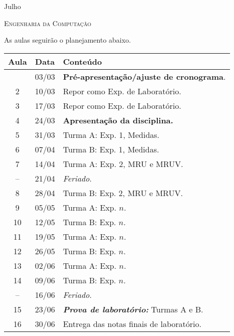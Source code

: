 %
\begin{marginfigure}
    \centering
    Julho\\
\end{marginfigure}
\vspace{1cm}
\begin{center}
\Large\textsc{Engenharia da Computação}
\end{center}

As aulas seguirão o planejamento abaixo.
\begin{center}
\begin{longtable}{ccp{70mm}}
\toprule
Aula & Data & Conteúdo \\
\midrule
\endhead
\bottomrule
\endfoot
 1 & 03/03 & \textbf{Pré-apresentação/ajuste de cronograma}. \\
 2 & 10/03 & Repor como Exp. de Laboratório. \\
 3 & 17/03 & Repor como Exp. de Laboratório. \\
 4 & 24/03 & \textbf{Apresentação da disciplina.} \\ 
 5 & 31/03 & Turma A: Exp. 1, Medidas. \\
 6 & 07/04 & Turma B: Exp. 1, Medidas. \\
 7 & 14/04 & Turma A: Exp. 2, MRU e MRUV. \\
-- & 21/04 & \emph{Feriado}. \\
 8 & 28/04 & Turma B: Exp. 2, MRU e MRUV. \\
 9 & 05/05 & Turma A: Exp. $n$. \\
10 & 12/05 & Turma B: Exp. $n$. \\
11 & 19/05 & Turma A: Exp. $n$. \\
12 & 26/05 & Turma B: Exp. $n$. \\
13 & 02/06 & Turma A: Exp. $n$. \\
14 & 09/06 & Turma B: Exp. $n$. \\
-- & 16/06 & \emph{Feriado}.\\
15 & 23/06 & \textbf{\textit{Prova de laboratório:}} Turmas A e B. \\
16 & 30/06 & Entrega das notas finais de laboratório.
\end{longtable}
\end{center}

